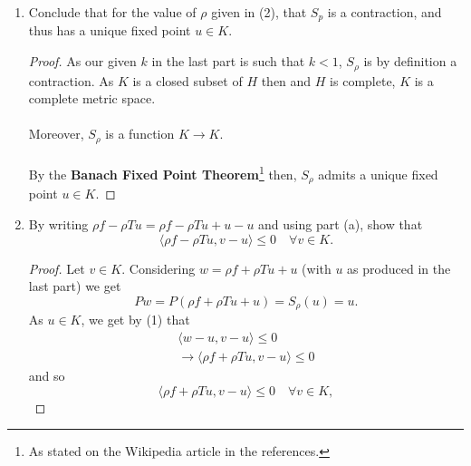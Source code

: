 \documentclass[12pt]{article}
\newenvironment{ex}[2][Exercise]{\begin{trivlist}
\item[\hskip \labelsep {\bfseries #1}\hskip \labelsep {\bfseries #2.}]}{\end{trivlist}}
\begin{document}
\begin{ex}{4}
\begin{enumerate}[label=(\alph*)]
\begin{enumerate}[label=(\arabic*)]
\begin{proof}
                \begin{align*}
                    (1 - 2\rho\alpha + \rho^2||T||^2) < 1 \\
                    \leftrightarrow \rho^2 ||T||^2 < 2\rho \alpha \\
                    \leftrightarrow \rho < \frac{2\alpha}{||T||^2}
                \end{align*}
                Thus choosing $\rho < \frac{2\alpha}{||T||^2}$ gets us a $k = (1 - 2\rho\alpha + \rho^2||T||^2) < 1$ for which we have 
                $$||S_\rho v_1 - S_\rho v_2||^2 \leq k||v_1 - v_2|| \quad \forall v_1, v_2 \in K$$
                as desired.
            \end{proof}
            \item Conclude that for the value of $\rho$ given in (2), that $S_p$ is a contraction, and thus has a unique fixed point $u \in K$. 
            \begin{proof}
                As our given $k$ in the last part is such that $k < 1$, $S_\rho$ is by definition a contraction. As $K$ is a closed subset of $H$ then and $H$ is complete, $K$ is a complete metric space. \\ \\
                Moreover, $S_\rho$ is a function $K \rightarrow K$. \\ \\
                By the \textbf{Banach Fixed Point Theorem}\footnote{As stated on the Wikipedia article in the references.} then, $S_\rho$ admits a unique fixed point $u \in K$.
            \end{proof}
            \item By writing $\rho f - \rho Tu = \rho f - \rho Tu + u - u$ and using part (a), show that 
            $$\langle \rho f - \rho Tu, v - u \rangle \leq 0 \quad \forall v \in K.$$
            \begin{proof}
                Let $v \in K$. Considering $w = \rho f + \rho Tu + u$ (with $u$ as produced in the last part) we get 
                $$Pw = P(\rho f + \rho Tu + u) = S_\rho(u) = u.$$
                As $u \in K$, we get by (1) that 
                \begin{align*}
                    \langle w - u, v - u \rangle \leq 0 \\
                    \longrightarrow \langle \rho f + \rho Tu, v - u \rangle \leq 0
                \end{align*}
                and so 
                $$\langle \rho f + \rho Tu, v - u \rangle \leq 0 \quad \forall v \in K,$$

\end{proof}
\end{enumerate}
\end{enumerate}
\end{ex}
\end{document}
